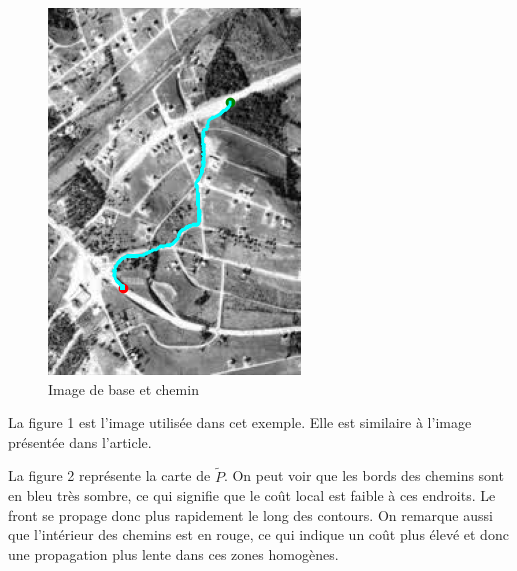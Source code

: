 \documentclass{article}
\begin{document}
\begin{figure}[h!]
\begin{minipage}{0.24\textwidth}
        \includegraphics[width=\linewidth]{result_image/Image_2/4.png}
        \caption*{\small Image de base et chemin}
    \end{minipage}
    \label{fig:images-tests}
\end{figure}

La figure 1 est l'image utilisée dans cet exemple. Elle est similaire à l'image présentée 
dans l'article.

La figure 2 représente la carte de $\tilde{P}$. On peut voir que les bords des chemins 
sont en bleu très sombre, ce qui signifie que le coût local est faible à ces endroits. 
Le front se propage donc plus rapidement le long des contours. 
On remarque aussi que l'intérieur des chemins est en rouge, ce qui indique un coût 
plus élevé et donc une propagation plus lente dans ces zones homogènes.
\end{document}
